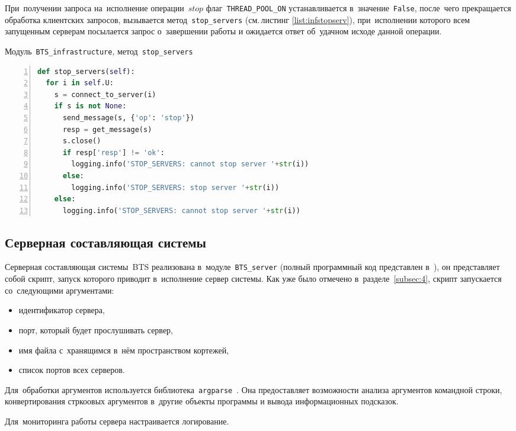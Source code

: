 При~получении запроса на~исполнение операции~$stop$ флаг~\texttt{THREAD_POOL_ON} устанавливается в~значение~\texttt{False}, после~чего прекращается обработка клиентских запросов, вызывается метод~\texttt{stop_servers} (см.\,листинг \ref{list:infstopserv}), при~исполнении которого всем запущенным серверам посылается запрос о~завершении работы и ожидается ответ об~удачном исходе данной операции.
\begin{ListingEnv}\caption{Модуль~\texttt{BTS\_infrastructure}, метод~\texttt{stop\_servers}}\label{list:infstopserv}
	\begin{lstlisting}[language=Python, numbers=left]
def stop_servers(self):
  for i in self.U:
    s = connect_to_server(i)
    if s is not None:
      send_message(s, {'op': 'stop'})
      resp = get_message(s)
      s.close()
      if resp['resp'] != 'ok':
        logging.info('STOP_SERVERS: cannot stop server '+str(i))
      else:
        logging.info('STOP_SERVERS: stop server '+str(i))
    else:
      logging.info('STOP_SERVERS: cannot stop server '+str(i))
	\end{lstlisting}
\end{ListingEnv}


\subsection{Серверная составляющая системы}\label{subsec:5}
Серверная составляющая системы~BTS реализована в~модуле~\texttt{BTS_server} (полный программный код представлен в~\autocite{mybts}), он представляет собой скрипт, запуск которого приводит в~исполнение сервер системы. Как уже было отмечено в~разделе~\ref{subsec:4}, скрипт запускается со~следующими аргументами:
\begin{itemize}
	\item идентификатор сервера,
	\item порт, который будет прослушивать сервер,
	\item имя файла с~хранящимся в~нём пространством кортежей,
	\item список портов всех серверов.
\end{itemize}
Для~обработки аргументов используется библиотека~\texttt{argparse}~\autocite{argparse}. Она предоставляет возможности анализа аргументов командной строки, конвертирования стркоовых аргументов в~другие объекты программы и вывода информационных подсказок.

Для~мониторинга работы сервера настраивается логирование.

